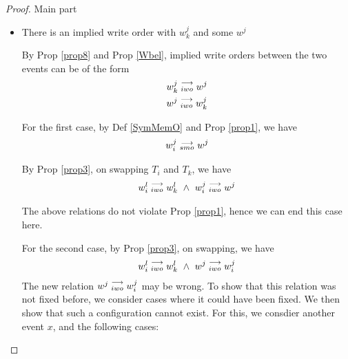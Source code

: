 \begin{proof}{Main part}
\begin{itemize}
\begin{itemize}

                        \end{itemize}
                        
                    \item There is an implied write order with $w_k^j$ and some $w^j$
                    
                        By Prop \ref{prop8} and Prop \ref{Wbel}, implied write orders between the two events can be of the form 
                        \begin{align*}
                            w_k^j\stackrel{\longrightarrow}{_{iwo}}w^j \\
                            w^j\stackrel{\longrightarrow}{_{iwo}}w_k^j 
                        \end{align*}

                        For the first case, by Def \ref{SymMemO} and Prop \ref{prop1}, we have
                        \begin{align*}
                            w_i^j\stackrel{\longrightarrow}{_{smo}}w^j
                        \end{align*}

                        By Prop \ref{prop3}, on swapping $T_i$ and $T_k$, we have 
                        \begin{align*}
                            \reln{w_i^l}{iwo}{w_k^l} \ \wedge \ \reln{w_i^j}{iwo}{w^j}
                        \end{align*}

                        The above relations do not violate Prop \ref{prop1}, hence we can end this case here. 

                        For the second case, by Prop \ref{prop3}, on swapping, we have 
                        \begin{align*}
                            \reln{w_i^l}{iwo}{w_k^l} \ \wedge \ \reln{w^j}{iwo}{w_i^j}
                        \end{align*}
                        The new relation $w^j\stackrel{\longrightarrow}{_{iwo}}w_i^j$ may be wrong. 
                        To show that this relation was not fixed before, we consider cases where it could have been fixed. We then show that such a configuration cannot exist. For this, we consdier another event $x$, and the following cases:


\end{itemize}
\end{proof}
